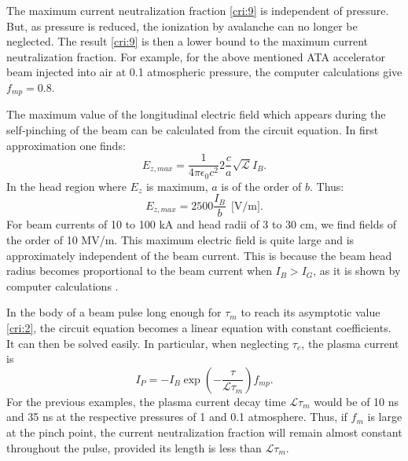 \documentclass [12pt,a4paper,     ]{report} %
\begin{document}
	The maximum current neutralization fraction \eqref{cri:9} is independent of pressure.  But, as pressure is reduced, the ionization by avalanche can no longer be neglected.  The result \eqref{cri:9} is then a lower bound to the maximum current neutralization fraction.  For example, for the above mentioned ATA accelerator beam injected into air at 0.1 atmospheric pressure, the computer calculations \cite{CHAMB1981-} give $f_{mp} = 0.8$.

	The maximum value of the longitudinal electric field which appears during the self-pinching of the beam can be calculated from the circuit equation.  In first approximation one finds:
%
\begin{equation}\label{cri:12} %
    E_{z,max} = \frac{1}{4\pi\epsilon_0c^2} 
               2\frac{c}{a} \sqrt{\mathcal{L}} I_B.
\end{equation}
%
In the head region where $E_z$ is maximum, $a$ is of the order of $b$.  Thus:
%
\begin{equation}\label{cri:13} %
             E_{z,max} = 2500 \frac{I_B}{b} ~~ \text{[V/m]}.
\end{equation} 
%
For beam currents of 10 to 100 kA and head radii of 3 to 30 cm, we find fields of the order of 10 MV/m.  This maximum electric field is quite large and is approximately independent of the beam current.  This is because the beam head radius becomes proportional to the beam current when $I_B > I_G$, as it is shown by computer calculations \cite{SHARP1980-}.

	In the body of a beam pulse long enough for $\tau_m$  to reach its asymptotic value \eqref{cri:2}, the circuit equation becomes a linear equation with constant coefficients.  It can then be solved easily.  In particular, when neglecting $\tau_e$, the plasma current is
%
\begin{equation}\label{cri:14} %
     I_P = - I_B \exp(-\frac{\tau}{\mathcal{L}\tau_m}) f_{mp}.
\end{equation}
%
For the previous examples, the plasma current decay time $\mathcal{L}\tau_m$ would be of 10 ns and 35 ns at the respective pressures of 1 and 0.1 atmosphere.  Thus, if $f_m$ is large at the pinch point, the current neutralization fraction will remain almost constant throughout the pulse, provided its length is less than $\mathcal{L}\tau_m$.
\end{document}

